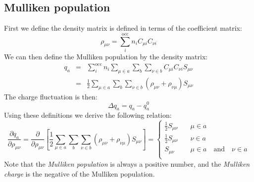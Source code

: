 \documentclass{article}
\numberwithin{equation}{section}
\begin{document}
\subsection{Mulliken population}
\label{sec:mulliken}
First we define the density matrix is defined in terms of the coefficient matrix:
\begin{equation}
    \rho_{\mu\nu} = \sum_i^\mathrm{occ} n_i C_{\mu i} C_{\nu i}
\end{equation}
We can then define the Mulliken population by the density matrix:
\begin{eqnarray}
    q_a 
    &=& \sum_i^\mathrm{occ} n_i \sum_{\mu \in a} \sum_b \sum_{\nu \in b} C_{\mu i} C_{\nu i} S_{\mu\nu}\nonumber\\
    &=& \frac{1}{2} \sum_{\mu \in a} \sum_b \sum_{\nu \in b} \left( \rho_{\mu\nu} + \rho_{\nu\mu}\right) S_{\mu\nu}
\end{eqnarray}
The charge fluctuation is then: 
\begin{equation}
    \Delta q_a = q_a - q_a^0
\end{equation}
Using these definitions we derive the following relation:
\begin{equation}
    \frac{\partial q_a}{\partial \rho_{\mu\nu}}
    = \frac{\partial }{\partial \rho_{\mu\nu}} \left[ \frac{1}{2} \sum_{\mu \in a} \sum_b \sum_{\nu \in b} \left( \rho_{\mu\nu} + \rho_{\nu\mu}\right) S_{\mu\nu} \right]
    = \begin{cases} 
        \frac{1}{2} S_{\mu\nu}& \quad \mu \in a\\
        \frac{1}{2} S_{\mu\nu}& \quad \nu \in a\\
        S_{\mu\nu}& \quad \mu \in a \quad \mathrm{and}\quad \nu \in a\\
    \end{cases}\label{eq:q_rho}
\end{equation}
Note that the \textit{Mulliken population} is always a positive number, and the \textit{Mulliken charge} is the negative of the Mulliken population.
\end{document}

